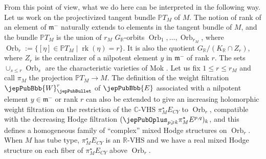 From this point of view, what we do here can be interpreted in the following way. Let us work on the projectivized tangent bundle $\mathbb PT_M$ of $M$. The notion of rank of an element of $\mathfrak m^-$ naturally extends to elements in the tangent bundle of $M$, and the bundle $\mathbb PT_M$ is the union of $r_M$ $G_{\mathbb R}$-orbits $\operatorname{Orb}_1,\ldots,\operatorname{Orb}_{r_M}$, where $\operatorname{Orb}_r:=\{[\eta]\in\mathbb PT_M\mid\operatorname{rk}(\eta)=r\}$. It is also the quotient $G_{\mathbb R}/(K_{\mathbb R}\cap Z_r)$, where $Z_r$ is the centralizer of a nilpotent element $y$ in $\mathfrak m^-$ of rank $r$. The sets $\cup_{s\leqslant r}\operatorname{Orb}_s$ are the characteristic varieties of Mok \cite{jep93Mok89}. Let us fix $1\leqslant r\leqslant r_M$ and call $\pi_M$ the projection $\mathbb PT_M\to M$. The definition of the weight filtration $\jepPubBbb{W}^r_\jepPubBullet$ of $\jepPubBbb{E}$ associated with a nilpotent element $y\in\mathfrak m^-$ or rank $r$ can also be extended to give an increasing holomorphic weight filtration on the restriction of the $\mathbb C$-VHS $\pi_M^\star E_{CY}$ to $\operatorname{Orb}_r$, compatible with the decreasing Hodge filtration $(\jepPubOplus_{p\geqslant k}\pi_M^\star E^{p,q})_k$, and this defines a homogeneous family of ``complex'' mixed Hodge structures on $\operatorname{Orb}_r$. When $M$ has tube type, $\pi_M^\star E_{CY}$ is an $\mathbb R$-VHS and we have a real mixed Hodge structure on each fiber of $\pi_M^\star E_{CY}$ above $\operatorname{Orb}_r$.
